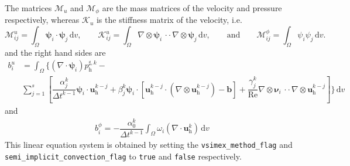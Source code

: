 \documentclass[]{scrartcl}
\renewcommand{\d}{\,\mathrm{d}}
\newcommand{\bs}[1]{\boldsymbol{#1}}
\newcommand{\cdott}{\, {\cdot}{\cdot}\,}
\begin{document}
The matrices $\mathcal{M}_u$ and $\mathcal{M}_\phi$ are the mass matrices of the velocity and pressure respectively, whereas $\mathcal{K}_u$ is the stiffness matrix of the velocity, i.e.
\begin{equation*}
	\mathcal{M}^u_{ij}= \int_{\Omega} \bs{\psi}_i \cdot \bs{\psi}_j \d v,
	\qquad
	\mathcal{K}^u_{ij} = \int_{\Omega} \nabla \otimes \bs{\psi}_i \cdott \nabla \otimes \bs{\psi}_j \d v,
	\qquad \textrm{and} \qquad
	\mathcal{M}^\phi_{ij} = \int_{\Omega} \psi_i \psi_j \d v.
\end{equation*}
and the right hand sides are 
\begin{equation*}
\begin{split}
	b^u_i &= \int_{\Omega}
\Bigg\lbrace
(\nabla \cdot \bs{\psi}_i) p^{\sharp, k}_\textrm{h}
- \\
&\sum_{j=1}^{s} 
\left[
\dfrac{\alpha_j^k}{\Delta t^{k-1}} \bs{\psi}_i \cdot \bs{u}^{k-j}_\textrm{h}
+
\beta_j^k \bs{\psi}_i \cdot \left[ \bs{u}^{k-j}_\textrm{h} \cdot (\nabla \otimes \bs{u}^{k-j}_\textrm{h} ) - \bs{b} \right]
+
\dfrac{\gamma_j^k}{\textrm{Re}} \nabla \otimes \bs{\nu}_i \cdott \nabla \otimes \bs{u}^{k-j}_\textrm{h}
\right]\Bigg\rbrace
\d v
\end{split}
\end{equation*}
and
\begin{equation*}
\begin{aligned}
b^\phi_i  = 	- \dfrac{\alpha_0^k}{\Delta t^{k-1}} 
\int_{\Omega}
\omega_i (\nabla \cdot \bs{u}^k_\textrm{h})
\d v
\end{aligned}
\end{equation*}
This linear equation system is obtained by setting the \texttt{vsimex\_method\_flag} and \\ \texttt{semi\_implicit\_convection\_flag} to \texttt{true} and \texttt{false} respectively.
\end{document}
